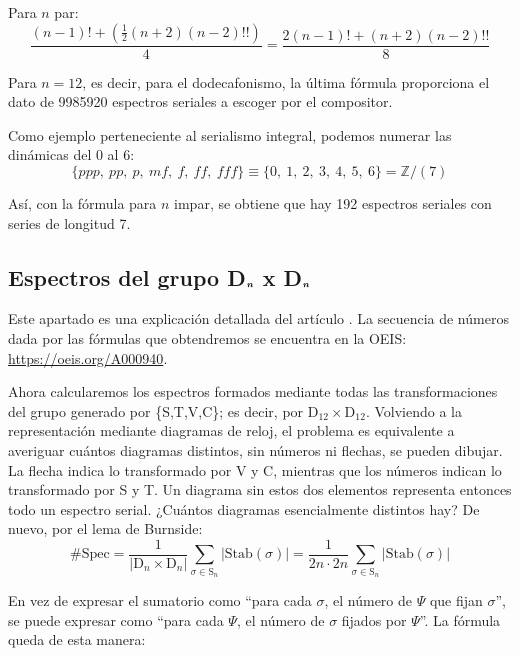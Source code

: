 		Para $n$ par:
		\[\frac{(n-1)!+\left(\frac{1}{2}(n+2)(n-2)!!\right)}{4}=\frac{2(n-1)!+(n+2)(n-2)!!}{8}\]
		
		Para $n=12$, es decir, para el dodecafonismo, la última fórmula proporciona el dato de 9985920 espectros seriales a escoger por el compositor.
		
		Como ejemplo perteneciente al serialismo integral, podemos numerar las dinámicas del 0 al 6:
		\[\{ppp,\ pp,\ p,\ m\!f,\ f,\ f\!\!f,\ f\!\!f\!\!f\} \equiv \{0,\ 1,\ 2,\ 3,\ 4,\ 5,\ 6\} = \mathbb{Z} / (7)\]
		
		Así, con la fórmula para $n$ impar, se obtiene que hay 192 espectros seriales con series de longitud 7.
	
	\subsection[Espectros del grupo D$_{n}$ x D$_{n}$]{Espectros del grupo D$_{\textbf{\textit{n}}}$ x D$_{\textbf{\textit{n}}}$}
	
		Este apartado es una explicación detallada del artículo \cite{polygons}. La secuencia de números dada por las fórmulas que obtendremos se encuentra en la OEIS: \url{https://oeis.org/A000940}.
	
		\begin{figure}[h]
			\begin{center}
			\end{center}
		\end{figure}
		Ahora calcularemos los espectros formados mediante todas las transformaciones del grupo generado por \{S,T,V,C\}; es decir, por $\text{D}_{12}\times \text{D}_{12}$. Volviendo a la representación mediante diagramas de reloj, el problema es equivalente a averiguar cuántos diagramas distintos, sin números ni flechas, se pueden dibujar. La flecha indica lo transformado por V y C, mientras que los números indican lo transformado por S y T. Un diagrama sin estos dos elementos representa entonces todo un espectro serial. ¿Cuántos diagramas esencialmente distintos hay? De nuevo, por el lema de Burnside:	
		\[\#\mbox{Spec}=\frac{1}{|\mbox{D}_{n}\times\mbox{D}_{n}|}\sum_{\sigma\in\mbox{S}_n}|\mbox{Stab}(\sigma)|=\frac{1}{2n\cdot2n}\sum_{\sigma\in\mbox{S}_n}|\mbox{Stab}(\sigma)|\]
		
		En vez de expresar el sumatorio como ``para cada $\sigma$, el número de $\Psi$ que fijan $\sigma$'', se puede expresar como ``para cada $\Psi$, el número de $\sigma$ fijados por $\Psi$''. La fórmula queda de esta manera:
		
